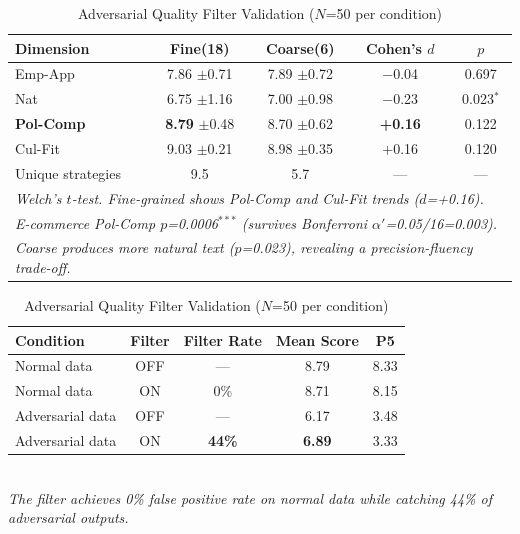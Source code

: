 \documentclass[11pt]{article}
\begin{document}
\begin{table}[t]
\begin{table}[t]
\centering
\caption{Expanded Strategy Granularity Evaluation ($N$=196/192, 4 domains, 1--10 Likert scale)}
\label{tab:strategy_granularity_expanded}
\begin{tabular}{lcccc}
\toprule
\textbf{Dimension} & \textbf{Fine(18)} & \textbf{Coarse(6)} & \textbf{Cohen's $d$} & \textbf{$p$} \\
\midrule
Emp-App & 7.86 {\scriptsize$\pm$0.71} & 7.89 {\scriptsize$\pm$0.72} & $-$0.04 & 0.697 \\
Nat & 6.75 {\scriptsize$\pm$1.16} & 7.00 {\scriptsize$\pm$0.98} & $-$0.23 & 0.023$^{*}$ \\
\textbf{Pol-Comp} & \textbf{8.79} {\scriptsize$\pm$0.48} & 8.70 {\scriptsize$\pm$0.62} & \textbf{+0.16} & 0.122 \\
Cul-Fit & 9.03 {\scriptsize$\pm$0.21} & 8.98 {\scriptsize$\pm$0.35} & +0.16 & 0.120 \\
\midrule
Unique strategies & 9.5 & 5.7 & --- & --- \\
\midrule
\multicolumn{5}{l}{\footnotesize \textit{Welch's $t$-test. Fine-grained shows Pol-Comp and Cul-Fit trends ($d$=+0.16).}} \\
\multicolumn{5}{l}{\footnotesize \textit{E-commerce Pol-Comp $p$=0.0006$^{***}$ (survives Bonferroni $\alpha'$=0.05/16=0.003).}} \\
\multicolumn{5}{l}{\footnotesize \textit{Coarse produces more natural text ($p$=0.023), revealing a precision-fluency trade-off.}} \\
\bottomrule
\end{tabular}
\end{table}

\begin{table}[t]
\centering
\caption{Adversarial Quality Filter Validation ($N$=50 per condition)}
\label{tab:filter_adversarial}
\begin{tabular}{lcccc}
\toprule
\textbf{Condition} & \textbf{Filter} & \textbf{Filter Rate} & \textbf{Mean Score} & \textbf{P5} \\
\midrule
Normal data & OFF & --- & 8.79 & 8.33 \\
Normal data & ON & 0\% & 8.71 & 8.15 \\
\midrule
Adversarial data & OFF & --- & 6.17 & 3.48 \\
Adversarial data & ON & \textbf{44\%} & \textbf{6.89} & 3.33 \\
\bottomrule
\end{tabular}
\smallskip
\\
\footnotesize{\textit{The filter achieves 0\% false positive rate on normal data while catching 44\% of adversarial outputs.}}
\end{table}


\end{table}
\end{document}
